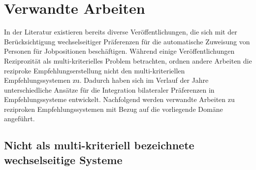 
\chapter{Verwandte Arbeiten}
\label{ch:verwandte_arbeiten}
In der Literatur existieren bereits diverse Veröffentlichungen, die sich mit der Berücksichtigung wechselseitiger Präferenzen für die automatische Zuweisung von Personen für Jobpositionen beschäftigen.
Während einige Veröffentlichungen Reziprozität als multi-kriterielles Problem betrachten, ordnen andere Arbeiten die reziproke Empfehlungserstellung nicht den multi-kriteriellen Empfehlungssystemen zu.
Dadurch haben sich im Verlauf der Jahre unterschiedliche Ansätze für die Integration bilateraler Präferenzen in Empfehlungssysteme entwickelt.
Nachfolgend werden verwandte Arbeiten zu reziproken Empfehlungssystemen mit Bezug auf die vorliegende Domäne angeführt.

\section{Nicht als multi-kriteriell bezeichnete wechselseitige Systeme}

